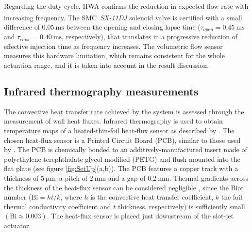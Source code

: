 Regarding the duty cycle, HWA confirms the reduction in expected flow rate with increasing frequency. The SMC\textsuperscript{\textregistered}~\textit{SX-11DJ} solenoid valve is certified with a small difference of $0.05~\mathrm{ms}$ between the opening and closing lapse time ($\tau_{open} = 0.45~\mathrm{ms}$ and $\tau_{close} = 0.40~\mathrm{ms}$, respectively), that translates in a progressive reduction of effective injection time as frequency increases. The volumetric flow sensor measures this hardware limitation, which remains consistent for the whole actuation range, and it is taken into account in the result discussion. 

\subsection{Infrared thermography measurements \label{ss:IR}}

The convective heat transfer rate achieved by the system is assessed through the measurement of wall heat fluxes. Infrared thermography is used to obtain temperature maps of a heated-thin-foil heat-flux sensor as described by \citet{astarita2012infrared}. The chosen heat-flux sensor is a Printed Circuit Board (PCB), similar to those used by \citet{torre2018HTF}. The PCB is chemically bonded to an additively-manufactured insert made of polyethylene terephthalate glycol-modified (PETG) and flush-mounted into the flat plate (see figure \ref{fig:SetUp}(a,b)). The PCB features a copper track with a thickness of $5~\mathrm{\mu m}$, a pitch of $2~\mathrm{mm}$ and a gap of $0.2~\mathrm{mm}$. Thermal gradients across the thickness of the heat-flux sensor can be considered negligible \citep{astarita2012infrared}, since the Biot number ($\mathrm{Bi} = h t/k$, where $h$ is the convective heat transfer coefficient, $k$ the foil thermal conductivity coefficient and $t$ thickness, respectively) is sufficiently small $(\mathrm{Bi} \approx 0.003)$. The heat-flux sensor is placed just downstream of the slot-jet actuator. 

